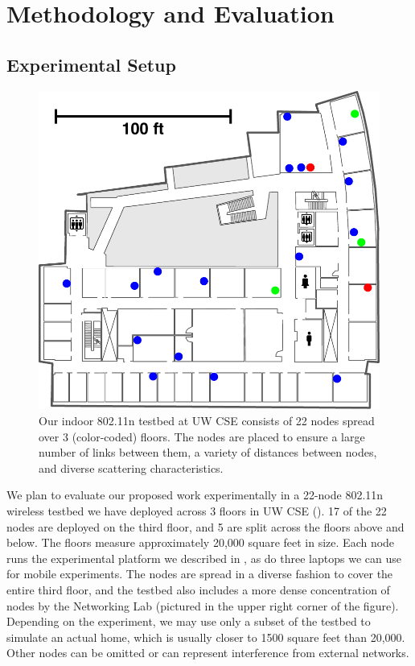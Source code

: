 \section{Methodology and Evaluation}
\label{sec:methodology}

\subsection{Experimental Setup}
\begin{figure}[t]
      \centering
      \includegraphics[width=0.8\columnwidth]{figures/floor3_grayscale_noee_testbed.pdf}
      \caption{\label{fig:testbed} Our indoor 802.11n testbed at UW CSE consists of 22 nodes spread over 3 (color-coded) floors. The nodes are placed to ensure a large number of links between them, a variety of distances between nodes, and diverse scattering characteristics.}
\end{figure}

 We plan to evaluate our proposed work experimentally in a 22-node 802.11n wireless testbed we have deployed across 3 floors in UW CSE (). 17 of the 22 nodes are deployed on the third floor, and 5 are split across the floors above and below. The floors measure approximately 20,000 square feet in size. Each node runs the experimental platform we described in , as do three laptops we can use for mobile experiments. The nodes are spread in a diverse fashion to cover the entire third floor, and the testbed also includes a more dense concentration of nodes by the Networking Lab (pictured in the upper right corner of the figure). Depending on the experiment, we may use only a subset of the testbed to simulate an actual home, which is usually closer to 1500 square feet than 20,000. Other nodes can be omitted or can represent interference from external networks.

